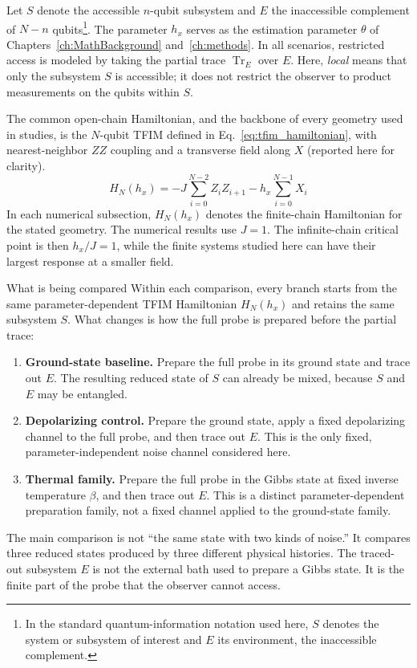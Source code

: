 Let $S$ denote the accessible $n$-qubit subsystem and $E$ the inaccessible complement of $N-n$ qubits\footnote{In the standard quantum-information notation used here, $S$ denotes the system or subsystem of interest and $E$ its environment, the inaccessible complement.}.  The parameter $h_x$ serves as the estimation parameter $\theta$ of Chapters~\ref{ch:MathBackground} and~\ref{ch:methods}.  In all scenarios, restricted access is modeled by taking the partial trace $\operatorname{Tr}_E$ over $E$.  Here, \emph{local} means that only the subsystem $S$ is accessible; it does not restrict the observer to product measurements on the qubits within $S$.

The common open-chain Hamiltonian, and the backbone of every geometry used in studies, is the $N$-qubit TFIM defined in Eq.~\eqref{eq:tfim_hamiltonian}, with nearest-neighbor $ZZ$ coupling and a transverse field along $X$ (reported here for clarity).
\begin{equation}
    H_N(h_x)=-J\sum_{i=0}^{N-2}Z_iZ_{i+1}-h_x\sum_{i=0}^{N-1}X_i
    \label{eq:noise_tfim_hamiltonian}
\end{equation}
In each numerical subsection, $H_N(h_x)$ denotes the finite-chain Hamiltonian for the stated geometry.  The numerical results use $J=1$.  The infinite-chain critical point is then $h_x/J=1$, while the finite systems studied here can have their largest response at a smaller field.

\begin{infobox}{What is being compared}
    Within each comparison, every branch starts from the same parameter-dependent TFIM Hamiltonian $H_N(h_x)$ and retains the same subsystem $S$.  What changes is how the full probe is prepared before the partial trace:
    \begin{enumerate}
        \item \textbf{Ground-state baseline.}  Prepare the full probe in its ground state and trace out $E$.  The resulting reduced state of $S$ can already be mixed, because $S$ and $E$ may be entangled.
        \item \textbf{Depolarizing control.}  Prepare the ground state, apply a fixed depolarizing channel to the full probe, and then trace out $E$.  This is the only fixed, parameter-independent noise channel considered here.
        \item \textbf{Thermal family.}  Prepare the full probe in the Gibbs state at fixed inverse temperature $\beta$, and then trace out $E$.  This is a distinct parameter-dependent preparation family, not a fixed channel applied to the ground-state family.
    \end{enumerate}
    The main comparison is not ``the same state with two kinds of noise.''  It compares three reduced states produced by three different physical histories.  The traced-out subsystem $E$ is not the external bath used to prepare a Gibbs state.  It is the finite part of the probe that the observer cannot access.
\end{infobox}

